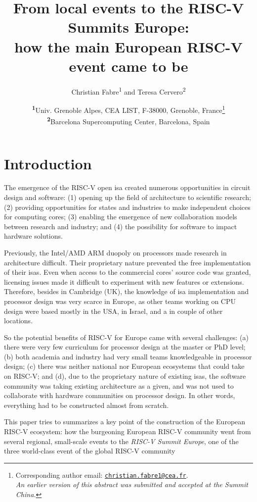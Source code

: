 \documentclass[
	a4paper, %
	10pt, %
	unnumberedsections, %
	twoside, %
]{LTJournalArticle}
\title{From local events to the RISC-V Summits Europe:\\
how the main European RISC-V event came to be} %
\author{%
	Christian Fabre\textsuperscript{1} and Teresa Cervero\textsuperscript{2}
}
\date{\footnotesize\textsuperscript{\textbf{1}}Univ. Grenoble Alpes, CEA LIST, F-38000, Grenoble, France\thanks{\;Corresponding author email: \href{mailto:christian.fabre1@cea.fr}{\tt christian.fabre1@cea.fr}.\\\emph{An earlier version of this abstract was submitted and accepted at the Summit China.}}\\ \textsuperscript{\textbf{2}}Barcelona Supercomputing Center, Barcelona, Spain}
\begin{document}
\maketitle %


\section{Introduction}

The emergence of the RISC-V open \gls{isa} created numerous opportunities in
circuit design and software: (1) opening up the field of \textmu
architecture to scientific research; (2) providing opportunities for
states and industries to make independent choices for computing cores;
(3) enabling the emergence of new collaboration models between
research and industry; and (4) the possibility for software to impact
hardware solutions.

Previously, the Intel/AMD ARM duopoly on processors made research in
\textmu architecture difficult. Their proprietary nature
prevented the free implementation of their \glspl{isa}. Even when access to
the commercial cores' source code was granted, licensing issues made
it difficult to experiment with new features
or extensions. Therefore, besides in Cambridge (UK), the knowledge of
\gls{isa} implementation and processor design was very scarce in
Europe, as other teams working on CPU design were based mostly in the
USA, in Israel, and a in couple of other locations.

So the potential benefits of RISC-V for Europe came with several
challenges: (a) there were very few curriculum for processor design at
the master or PhD level; (b) both academia and industry had very small
teams knowledgeable in processor design; (c) there was neither
national nor European ecosystems that could take on RISC-V; and (d),
due to the proprietary nature of existing \glspl{isa}, the software community
was taking existing architecture as a given, and was not used to
collaborate with hardware communities on processor design.  In other
words, everything had to be constructed almost from scratch.

This paper tries to summarizes a key point of the construction of the
European RISC-V ecosystem: how the burgeoning European RISC-V
community went from several regional, small-scale events to the
\emph{RISC-V Summit Europe}, one of the three world-class event of the
global RISC-V community
\end{document}
